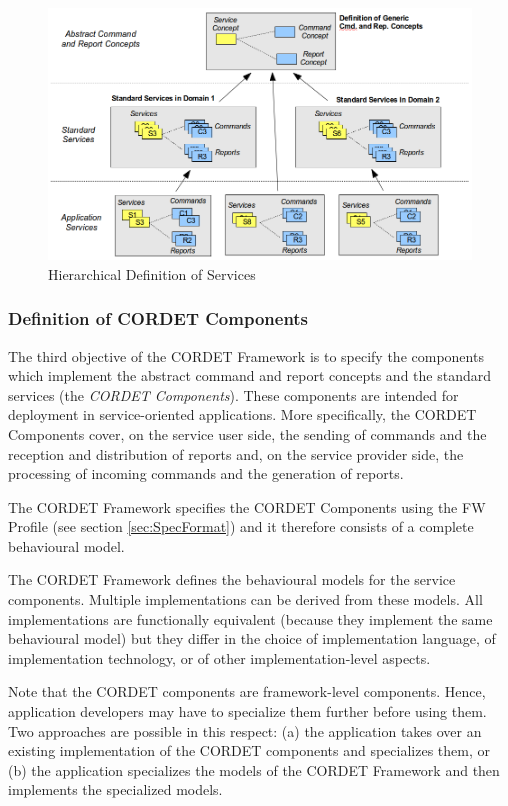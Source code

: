 \documentclass[a4paper,10pt]{article}
\begin{document}
\begin{figure}[ht]
 \centering
 \includegraphics[scale=0.3,keepaspectratio=true]{HierarchicalDefServ.png}
 \caption{Hierarchical Definition of Services}
 \label{fig:HierarchicalDefServ}
\end{figure}


\subsubsection{Definition of CORDET Components}\label{sec:crComponents}
The third objective of the CORDET Framework is to specify the components which implement the abstract command and report concepts and the standard services (the \textit{CORDET Components}). These components are intended for deployment in service-oriented applications. More specifically, the CORDET Components cover, on the service user side, the sending of commands and the reception and distribution of reports and, on the service provider side, the processing of incoming commands and the generation of reports.

The CORDET Framework specifies the CORDET Components using the FW Profile (see section \ref{sec:SpecFormat}) and it therefore consists of a complete behavioural model.  

The CORDET Framework defines the behavioural models for the service components. Multiple implementations can be derived from these models. All implementations are functionally equivalent (because they implement the same behavioural model) but they differ in the choice of implementation language, of implementation technology, or of other implementation-level aspects. 

Note that the CORDET components are framework-level components. Hence, application developers may have to specialize them further before using them. Two approaches are possible in this respect: (a) the application takes over an existing implementation of the CORDET components and specializes them, or (b) the application specializes the models of the CORDET Framework and then implements the specialized models.
\end{document}
